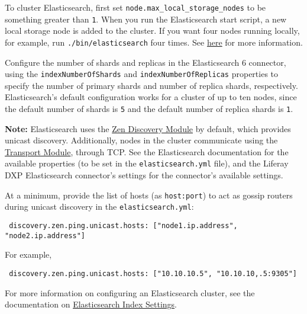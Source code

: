 To cluster Elasticsearch, first set
\texttt{node.max\_local\_storage\_nodes} to be something greater than
\texttt{1}. When you run the Elasticsearch start script, a new local
storage node is added to the cluster. If you want four nodes running
locally, for example, run \texttt{./bin/elasticsearch} four times. See
\href{https://www.elastic.co/guide/en/elasticsearch/reference/7.x/modules-node.html\#max-local-storage-nodes}{here}
for more information.

Configure the number of shards and replicas in the Elasticsearch 6
connector, using the \texttt{indexNumberOfShards} and
\texttt{indexNumberOfReplicas} properties to specify the number of
primary shards and number of replica shards, respectively.
Elasticsearch's default configuration works for a cluster of up to ten
nodes, since the default number of shards is \texttt{5} and the default
number of replica shards is \texttt{1}.

\noindent\hrulefill

\textbf{Note:} Elasticsearch uses the
\href{https://www.elastic.co/guide/en/elasticsearch/reference/6.x/modules-discovery-zen.html}{Zen
Discovery Module} by default, which provides unicast discovery.
Additionally, nodes in the cluster communicate using the
\href{https://www.elastic.co/guide/en/elasticsearch/reference/7.x/modules-transport.html}{Transport
Module}, through TCP. See the Elasticsearch documentation for the
available properties (to be set in the \texttt{elasticsearch.yml} file),
and the Liferay DXP Elasticsearch connector's settings for the
connector's available settings.

At a minimum, provide the list of hosts (as \texttt{host:port}) to act
as gossip routers during unicast discovery in the
\texttt{elasticsearch.yml}:

\begin{verbatim}
 discovery.zen.ping.unicast.hosts: ["node1.ip.address", "node2.ip.address"]
\end{verbatim}

For example,

\begin{verbatim}
 discovery.zen.ping.unicast.hosts: ["10.10.10.5", "10.10.10,.5:9305"]
\end{verbatim}

For more information on configuring an Elasticsearch cluster, see the
documentation on
\href{https://www.elastic.co/guide/en/elasticsearch/reference/7.x/index-modules.html}{Elasticsearch
Index Settings}.

\noindent\hrulefill

